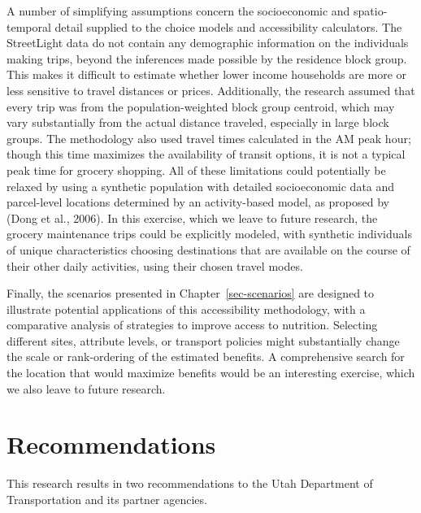 \documentclass[
  letterpaper,
  DIV=11,
  numbers=noendperiod]{scrreport}
\begin{document}
A number of simplifying assumptions concern the socioeconomic and
spatio-temporal detail supplied to the choice models and accessibility
calculators. The StreetLight data do not contain any demographic
information on the individuals making trips, beyond the inferences made
possible by the residence block group. This makes it difficult to
estimate whether lower income households are more or less sensitive to
travel distances or prices. Additionally, the research assumed that
every trip was from the population-weighted block group centroid, which
may vary substantially from the actual distance traveled, especially in
large block groups. The methodology also used travel times calculated in
the AM peak hour; though this time maximizes the availability of transit
options, it is not a typical peak time for grocery shopping. All of
these limitations could potentially be relaxed by using a synthetic
population with detailed socioeconomic data and parcel-level locations
determined by an activity-based model, as proposed by (Dong et al.,
2006). In this exercise, which we leave to future research, the grocery
maintenance trips could be explicitly modeled, with synthetic
individuals of unique characteristics choosing destinations that are
available on the course of their other daily activities, using their
chosen travel modes.

Finally, the scenarios presented in Chapter~\ref{sec-scenarios} are
designed to illustrate potential applications of this accessibility
methodology, with a comparative analysis of strategies to improve access
to nutrition. Selecting different sites, attribute levels, or transport
policies might substantially change the scale or rank-ordering of the
estimated benefits. A comprehensive search for the location that would
maximize benefits would be an interesting exercise, which we also leave
to future research.

\hypertarget{sec-recommend}{%
\section{Recommendations}\label{sec-recommend}}

This research results in two recommendations to the Utah Department of
Transportation and its partner agencies.
\end{document}
